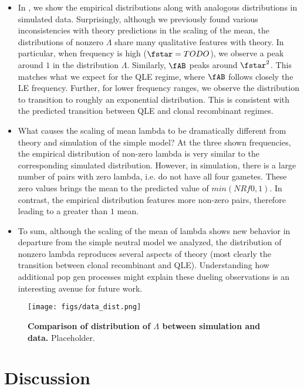 \documentclass[aps,rmp,twocolumn,groupedaddress,floatfix,notitlepage]{revtex4-1}
\begin{document}
\begin{itemize}
    \item In \fig{}, we show the empirical distributions along with analogous distributions in simulated data. Surprisingly, although we previously found various inconsistencies with theory predictions in the scaling of the mean, the distributions of nonzero $\Lambda$ share many qualitative features with theory. In particular, when frequency is high ($\fstar=TODO$), we observe a peak around $1$ in the distribution $\Lambda$. Similarly, $\fAB$ peaks around $\fstar^2$. This matches what we expect for the QLE regime, where $\fAB$ follows closely the LE frequency. Further, for lower frequency ranges, we observe the distribution to transition to roughly an exponential distribution. This is consistent with the predicted transition between QLE and clonal recombinant regimes.
    
    \item What causes the scaling of mean lambda to be dramatically different from theory and simulation of the simple model? At the three shown frequencies, the empirical distribution of non-zero lambda is very similar to the corresponding simulated distribution. However, in simulation, there is a large number of pairs with zero lambda, i.e. do not have all four gametes. These zero values brings the mean to the predicted value of $min(NRf0, 1)$. In contrast, the empirical distribution features more non-zero pairs, therefore leading to a greater than $1$ mean.
    
    \item To sum, although the scaling of the mean of lambda shows new behavior in departure from the simple neutral model we analyzed, the distribution of nonzero lambda reproduces several aspects of theory (most clearly the transition between clonal recombinant and QLE). Understanding how additional pop gen processes might explain these dueling observations is an interesting avenue for future work.

\end{itemize}

\begin{figure*}[t]
\centering
\texttt{[image: figs/data\_dist.png]} 
\hfill
\caption{\textbf{Comparison of distribution of $\Lambda$ between simulation and data.} Placeholder. \label{fig:data_dist}}
\end{figure*}

\section*{Discussion}
\end{document}
